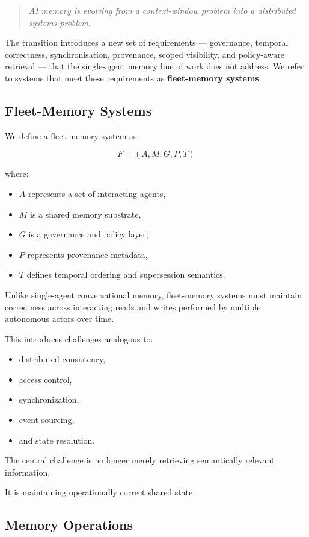 \documentclass[10pt,twocolumn,letterpaper]{article}
\begin{document}
\begin{quote}
\emph{AI memory is evolving from a context-window problem into a distributed systems problem.}
\end{quote}

The transition introduces a new set of requirements --- governance, temporal correctness, synchronisation, provenance, scoped visibility, and policy-aware retrieval --- that the single-agent memory line of work does not address. We refer to systems that meet these requirements as \textbf{fleet-memory systems}.

\subsection{Fleet-Memory Systems}

We define a fleet-memory system as:

\[
F = (A, M, G, P, T)
\]

where:
\begin{itemize}
    \item \(A\) represents a set of interacting agents,
    \item \(M\) is a shared memory substrate,
    \item \(G\) is a governance and policy layer,
    \item \(P\) represents provenance metadata,
    \item \(T\) defines temporal ordering and supersession semantics.
\end{itemize}

Unlike single-agent conversational memory, fleet-memory systems must maintain correctness across interacting reads and writes performed by multiple autonomous actors over time.

This introduces challenges analogous to:
\begin{itemize}
    \item distributed consistency,
    \item access control,
    \item synchronization,
    \item event sourcing,
    \item and state resolution.
\end{itemize}

The central challenge is no longer merely retrieving semantically relevant information.

It is maintaining operationally correct shared state.

\subsection{Memory Operations}
\end{document}
